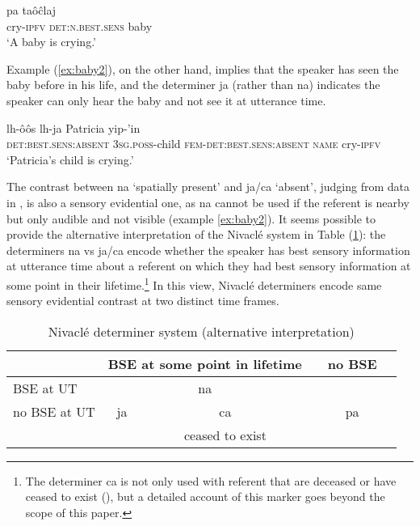 \documentclass[oneside,a4paper,11pt]{article}
\newcommand{\ipa}[1]{{\phon \mbox{#1}}} %
\begin{document}
\begin{exe}
\ex  \label{ex:baby1}
\gll   \ipa{yip-'in}  \ipa{pa} \ipa{taôĉlaj} \\
cry-\textsc{ipfv} \textsc{det:n.best.sens} baby \\
\glt  `A baby is crying.'
\end{exe}

Example (\ref{ex:baby2}), on the other hand, implies that the speaker has seen the baby before in his life, and the determiner  \ipa{ja} (rather than \ipa{na}) indicates the speaker can only hear the baby and not see it at utterance time.

\begin{exe}
\ex  \label{ex:baby2}
\gll    \ipa{ja} \ipa{lh-ôôs} \ipa{lh-ja} \ipa{Patricia} \ipa{yip-'in} \\
\textsc{det:best.sens:absent} \textsc{3sg.poss}-child \textsc{fem-det:best.sens:absent}
\textsc{name} cry-\textsc{ipfv}  \\
\glt  `Patricia's child is crying.'
\end{exe}

The contrast between \ipa{na} `spatially present' and \ipa{ja/ca} `absent', judging from data in \citet{gutierrez14determiners}, is also a sensory evidential one, as \ipa{na} cannot be used if the referent is nearby but only audible and not visible (example \ref{ex:baby2}). It seems possible to provide the alternative interpretation of the Nivaclé system in Table (\ref{tab:nivakle2}): the determiners \ipa{na} vs \ipa{ja/ca} encode whether the speaker has best sensory information at utterance time about a referent on which they had best sensory information at some point in their lifetime.\footnote{The determiner \ipa{ca} is not only used with referent that are deceased or have ceased to exist (\citealt[63-4]{fabre14nivacle}), but a detailed account of this marker goes beyond the scope of this paper. } In this view, Nivaclé determiners encode same sensory evidential contrast at two distinct time frames.
  
 
\begin{table}[H]
\caption{Nivaclé determiner system (alternative interpretation) } \centering \label{tab:nivakle2}
\begin{tabular}{l|c|cc|cc}
\toprule
&\multicolumn{2}{c}{BSE at some point in lifetime} && no BSE \\
\hline
BSE at UT& \multicolumn{2}{c}{\ipa{na}}&& \\
\cline{1-4}
no BSE at UT&\ipa{ja} & \ipa{ca}&&\ipa{pa}& \\
&&ceased to exist&\\
\bottomrule
\end{tabular}
\end{table}
\end{document}
